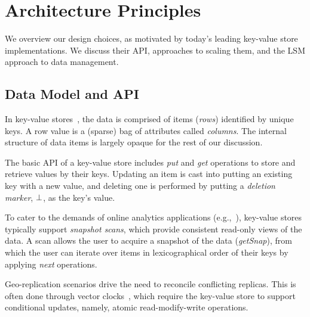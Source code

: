 \section{Architecture Principles}
\label{sec:background}


We overview our design choices, as motivated by today's leading key-value store implementations.
We discuss their API, approaches to scaling them, and the LSM approach to data management.

\subsection{Data Model and API}
\label{ssec:kvs}

In key-value stores~\cite{Bigtable2006,PNUTS2008,hbase}, the data is comprised
of items ({\em rows}) identified by unique keys. A row value is a (sparse) bag of attributes called {\em columns}.
The internal structure of data items is largely opaque for the rest of our discussion.

The basic API of a key-value store includes \emph{put} and \emph{get} operations to store and retrieve values by their keys.
Updating an item is cast into putting an existing key with a new value, and deleting
one is performed by putting a \emph{deletion marker}, $\bot$, as the key's value.

To cater to the demands of online analytics applications (e.g.,~\cite{Percolator2010}), key-value stores typically
support \emph{snapshot scans}, which provide consistent read-only views of the data. A scan allows the user to acquire a
snapshot of the data (\emph{getSnap}), from which the user can iterate over
items in lexicographical order of their keys by applying \emph{next} operations.

Geo-replication scenarios drive the need to reconcile conflicting replicas.
This is often done through vector clocks~\cite{Dynamo07}, which require the key-value store
to support conditional updates, namely, atomic read-modify-write
operations.


